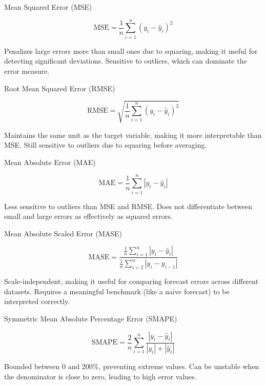\documentclass{article}
\numberwithin{equation}{section}
\begin{document}
Mean Squared Error (MSE)

\begin{equation}
    \text{MSE} = \frac{1}{n} \sum_{i=1}^{n} (y_i - \hat{y}_i)^2
\end{equation}

Penalizes large errors more than small ones due to squaring, making it useful for detecting significant deviations.
Sensitive to outliers, which can dominate the error measure.

Root Mean Squared Error (RMSE)

\begin{equation}
    \text{RMSE} = \sqrt{\frac{1}{n} \sum_{i=1}^{n} (y_i - \hat{y}_i)^2}
\end{equation}

Maintains the same unit as the target variable, making it more interpretable than MSE.
Still sensitive to outliers due to squaring before averaging.

Mean Absolute Error (MAE)

\begin{equation}
    \text{MAE} = \frac{1}{n} \sum_{i=1}^{n} |y_i - \hat{y}_i|
\end{equation}

Less sensitive to outliers than MSE and RMSE.
Does not differentiate between small and large errors as effectively as squared errors.

Mean Absolute Scaled Error (MASE)

\begin{equation}
    \text{MASE} = \frac{\frac{1}{n} \sum_{i=1}^{n} |y_i - \hat{y}_i|}{\frac{1}{n} \sum_{i=2}^{n} |y_i - y_{i-1}|}
\end{equation}

Scale-independent, making it useful for comparing forecast errors across different datasets.
Requires a meaningful benchmark (like a naive forecast) to be interpreted correctly.

Symmetric Mean Absolute Percentage Error (SMAPE)

\begin{equation}
    \text{SMAPE} = \frac{2}{n} \sum_{i=1}^{n} \frac{|y_i - \hat{y}_i|}{|y_i| + |\hat{y}_i|}
\end{equation}

Bounded between 0 and 200\%, preventing extreme values.
Can be unstable when the denominator is close to zero, leading to high error values.
\end{document}
